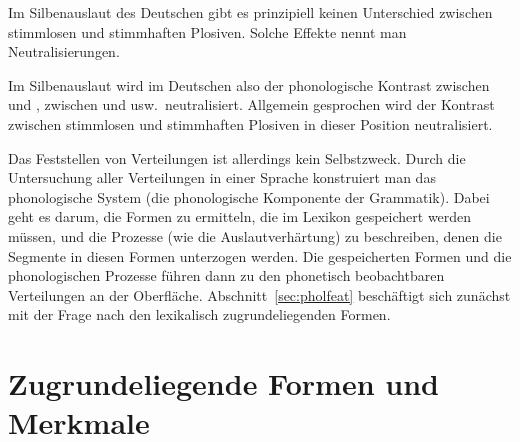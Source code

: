 \begin{exe}
  \ex\label{ex:phol-5674-1}
  \begin{xlist}
  \end{xlist}
  \ex\label{ex:phol-5674-2}
  \begin{xlist}
  \end{xlist}
  \ex\label{ex:phol-5674-3}
  \begin{xlist}
  \end{xlist}
\end{exe}

Im Silbenauslaut des Deutschen gibt es prinzipiell keinen Unterschied zwischen stimmlosen und stimmhaften Plosiven.
Solche Effekte nennt man Neutralisierungen.


Im Silbenauslaut wird im Deutschen also der phonologische Kontrast zwischen \textipa{[g]} und \textipa{[k]}, zwischen \textipa{[d]} und \textipa{[t]} usw.\ neutralisiert.
Allgemein gesprochen wird der Kontrast zwischen stimmlosen und stimmhaften Plosiven in dieser Position neutralisiert.

Das Feststellen von Verteilungen ist allerdings kein Selbstzweck.
Durch die Untersuchung aller Verteilungen in einer Sprache konstruiert man das phonologische System (die phonologische Komponente der Grammatik).
Dabei geht es darum, die Formen zu ermitteln, die im Lexikon gespeichert werden müssen, und die Prozesse (wie die Auslautverhärtung) zu beschreiben, denen die Segmente in diesen Formen unterzogen werden.
Die gespeicherten Formen und die phonologischen Prozesse führen dann zu den phonetisch beobachtbaren Verteilungen an der Oberfläche.
Abschnitt~\ref{sec:pholfeat} beschäftigt sich zunächst mit der Frage nach den lexikalisch zugrundeliegenden Formen.

\section{Zugrundeliegende Formen und Merkmale}

